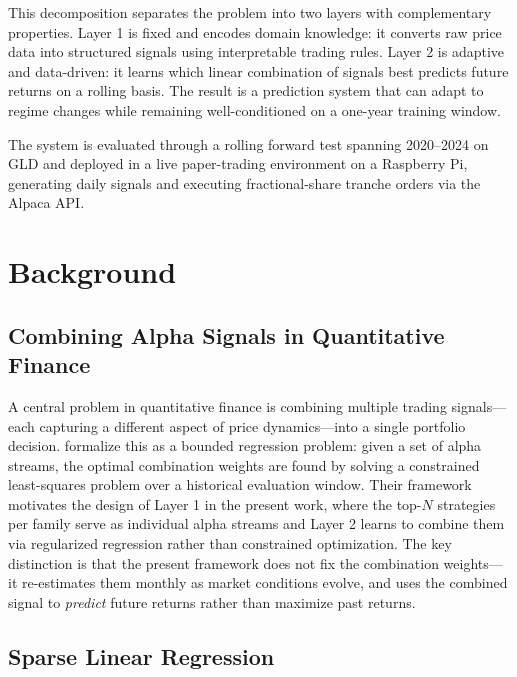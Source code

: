 \documentclass[11pt, letterpaper]{article}
\begin{document}
This decomposition separates the problem into two layers with complementary
properties. Layer 1 is fixed and encodes domain knowledge: it converts raw
price data into structured signals using interpretable trading rules. Layer 2
is adaptive and data-driven: it learns which linear combination of signals best
predicts future returns on a rolling basis. The result is a prediction system
that can adapt to regime changes while remaining well-conditioned on a
one-year training window.

The system is evaluated through a rolling forward test spanning 2020--2024
on GLD and deployed in a live paper-trading environment on a Raspberry Pi,
generating daily signals and executing fractional-share tranche orders via
the Alpaca API.

\section{Background}

\subsection{Combining Alpha Signals in Quantitative Finance}

A central problem in quantitative finance is combining multiple trading
signals---each capturing a different aspect of price dynamics---into a single
portfolio decision. \citet{kakushadze2015} formalize this as a bounded
regression problem: given a set of alpha streams, the optimal combination
weights are found by solving a constrained least-squares problem over a
historical evaluation window. Their framework motivates the design of Layer 1
in the present work, where the top-$N$ strategies per family serve as
individual alpha streams and Layer 2 learns to combine them via regularized
regression rather than constrained optimization. The key distinction is that
the present framework does not fix the combination weights---it re-estimates
them monthly as market conditions evolve, and uses the combined signal to
\emph{predict} future returns rather than maximize past returns.

\subsection{Sparse Linear Regression}
\end{document}
